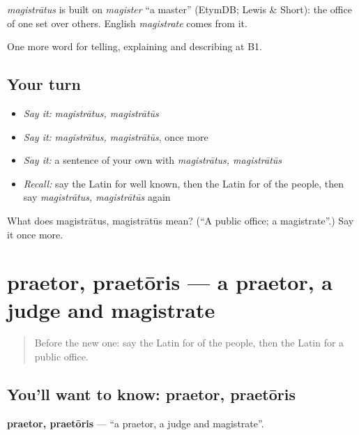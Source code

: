 \begin{cousinweb}
\emph{magistrātus} is built on \emph{magister} \textquotedblleft{}a master\textquotedblright{} (EtymDB; Lewis \& Short): the office of one set over others. English \emph{magistrate} comes from it.
\end{cousinweb}

\begin{grammarlens}[title={What you've built}]
One more word for telling, explaining and describing at B1.
\end{grammarlens}

\subsection*{Your turn}
\begin{itemize}
\raggedright
  \item \emph{Say it:} \emph{magistrātus, magistrātūs}
  \item \emph{Say it:} \emph{magistrātus, magistrātūs}, once more
  \item \emph{Say it:} a sentence of your own with \emph{magistrātus, magistrātūs}
  \item \emph{Recall:} say the Latin for well known, then the Latin for of the people, then say \emph{magistrātus, magistrātūs} again
\end{itemize}

\begin{tcolorbox}[breakable,colback=teal!4,colframe=teal!35!black,title={Before you move on}]
What does magistrātus, magistrātūs mean? (\textquotedblleft{}A public office; a magistrate\textquotedblright{}.) Say it once more.
\end{tcolorbox}
\section[praetor, praetōris]{praetor, praetōris — a praetor, a judge and magistrate}

\label{lesson:LA-C383-praetor}



\begin{quote}
Before the new one: say the Latin for of the people, then the Latin for a public office.
\end{quote}

\subsection*{You'll want to know: praetor, praetōris}
\textbf{praetor, praetōris} — \textquotedblleft{}a praetor, a judge and magistrate\textquotedblright{}.

